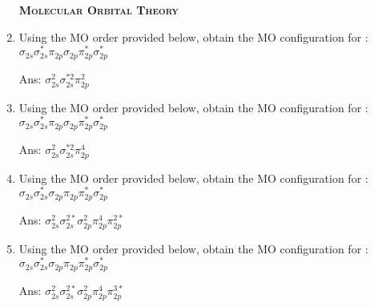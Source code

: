 \documentclass[main.tex]{subfiles}
\begin{document}
\begin{multicols*}{2}
\begin{enumerate}
{\raggedright\textsc{\textbf{Molecular Orbital Theory}}\par}
\item  Using the MO order provided below, obtain the MO configuration for : \\
$\sigma^{}_{2s}\sigma^{*}_{2s}\pi^{}_{2p}\sigma^{}_{2p}\pi^{*}_{2p}\sigma^{*}_{2p}$
 \begin{flushright}\small Ans:  $\sigma^{2}_{2s}\sigma^{*2}_{2s}\pi^{2}_{2p}$ \end{flushright}
\item  Using the MO order provided below, obtain the MO configuration for : \\
$\sigma^{}_{2s}\sigma^{*}_{2s}\pi^{}_{2p}\sigma^{}_{2p}\pi^{*}_{2p}\sigma^{*}_{2p}$
 \begin{flushright}\small Ans:  $\sigma^{2}_{2s}\sigma^{*2}_{2s}\pi^{4}_{2p}$ \end{flushright}
 
\item  Using the MO order provided below, obtain the MO configuration for :\\
$\sigma^{}_{2s}\sigma^{*}_{2s} \sigma^{}_{2p}\pi^{}_{2p}\pi^{*}_{2p}\sigma^{*}_{2p}$
 \begin{flushright}\small Ans:  $\sigma^{2}_{2s}\sigma^{2*}_{2s} \sigma^{2}_{2p}\pi^{4}_{2p}\pi^{2*}_{2p}$ \end{flushright}

\item  Using the MO order provided below, obtain the MO configuration for : \\
$\sigma^{}_{2s}\sigma^{*}_{2s} \sigma^{}_{2p}\pi^{}_{2p}\pi^{*}_{2p}\sigma^{*}_{2p}$
 \begin{flushright}\small Ans:  $\sigma^{2}_{2s}\sigma^{2*}_{2s} \sigma^{2}_{2p}\pi^{4}_{2p}\pi^{3*}_{2p}$ \end{flushright}





\end{enumerate}
\end{multicols*}
\end{document}
